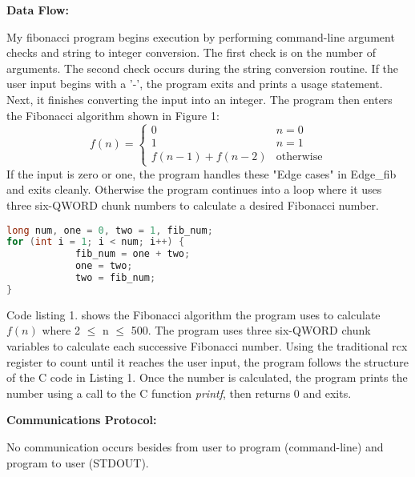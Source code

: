 \documentclass{article}
\begin{document}
\begin{flushleft}
\textbf{Data Flow:}
\vspace{.5pc}
\end{flushleft}

My fibonacci program begins execution by performing command-line argument 
checks and string to integer conversion.  The first check is on the number of 
arguments.  The second check occurs during the string conversion routine.  If 
the user input begins with a '-', the program exits and prints a usage 
statement.  Next, it finishes converting the input into an integer. The 
program then enters the Fibonacci algorithm shown in Figure 1:
\begin{equation}
    f(n) = \begin{cases}
               0               & n = 0\\
               1               & n = 1\\
               f(n-1) + f(n-2) & \text{otherwise}
           \end{cases}
\end{equation}
If the input is zero or one, the program handles these "Edge cases" in
Edge\_fib and exits cleanly.  Otherwise the program continues into a loop 
where it uses three six-QWORD chunk numbers to calculate a desired Fibonacci
number.

\begin{lstlisting}[language=C, caption=Fibonacci in C]
long num, one = 0, two = 1, fib_num;
for (int i = 1; i < num; i++) {
            fib_num = one + two;
            one = two;
            two = fib_num;
}
\end{lstlisting}
Code listing 1. shows the Fibonacci algorithm the program uses to calculate 
$f(n)$ where 2 $\leq$ n $\leq$ 500.  The program uses three six-QWORD chunk 
variables to calculate each successive Fibonacci number.  Using the 
traditional rcx register to count until it reaches the user input, the program
follows the structure of the C code in Listing 1.  Once the number is 
calculated, the program prints the number using a call to the C function 
\textit{printf}, then returns 0 and exits. 
\vspace{.5pc}

\begin{flushleft}
\textbf{Communications Protocol:}
\vspace{.5pc}
\end{flushleft}
No communication occurs besides from user to program (command-line) and 
program to user (STDOUT).
\vspace{.5pc}
\end{document}
